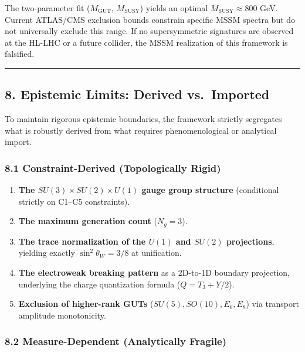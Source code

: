 \documentclass[
]{article}
\providecommand{\tightlist}{%
  \setlength{\itemsep}{0pt}\setlength{\parskip}{0pt}}
\begin{document}
The two-parameter fit (\(M_{\mathrm{GUT}}\), \(M_{\mathrm{SUSY}}\))
yields an optimal \(M_{\mathrm{SUSY}} \approx 800\) GeV. Current
ATLAS/CMS exclusion bounds constrain specific MSSM spectra but do not
universally exclude this range. If no supersymmetric signatures are
observed at the HL-LHC or a future collider, the MSSM realization of
this framework is falsified.

\begin{center}\rule{0.5\linewidth}{0.5pt}\end{center}

\hypertarget{epistemic-limits-derived-vs.-imported}{%
\subsection{8. Epistemic Limits: Derived
vs.~Imported}\label{epistemic-limits-derived-vs.-imported}}

To maintain rigorous epistemic boundaries, the framework strictly
segregates what is robustly derived from what requires phenomenological
or analytical import.

\hypertarget{constraint-derived-topologically-rigid}{%
\subsubsection{8.1 Constraint-Derived (Topologically
Rigid)}\label{constraint-derived-topologically-rigid}}

\begin{enumerate}
\def\labelenumi{\arabic{enumi}.}
\tightlist
\item
  \textbf{The \(SU(3) \times SU(2) \times U(1)\) gauge group structure}
  (conditional strictly on C1--C5 constraints).
\item
  \textbf{The maximum generation count} (\(N_g = 3\)).
\item
  \textbf{The trace normalization of the \(U(1)\) and \(SU(2)\)
  projections}, yielding exactly \(\sin^2\theta_W = 3/8\) at
  unification.
\item
  \textbf{The electroweak breaking pattern} as a 2D-to-1D boundary
  projection, underlying the charge quantization formula
  (\(Q = T_3 + Y/2\)).
\item
  \textbf{Exclusion of higher-rank GUTs} (\(SU(5), SO(10), E_6, E_8\))
  via transport amplitude monotonicity.
\end{enumerate}

\hypertarget{measure-dependent-analytically-fragile}{%
\subsubsection{8.2 Measure-Dependent (Analytically
Fragile)}\label{measure-dependent-analytically-fragile}}
\end{document}
